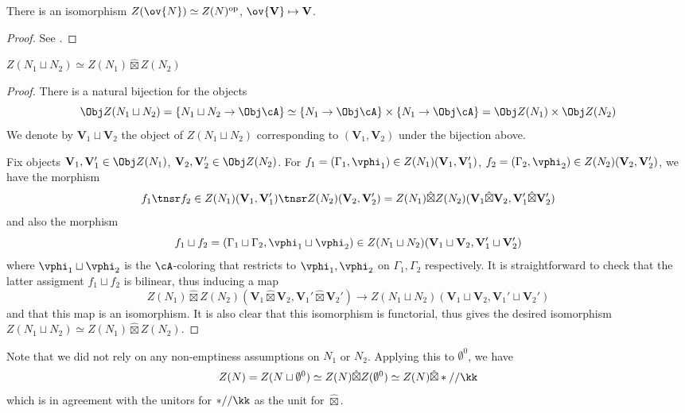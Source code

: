 \documentclass[12pt]{article}
\newcommand{\empt}[1]{{\emptyset^{#1}}}
\newcommand{\VV}{{\mathbf{V}}}
\newcommand{\op}{{\text{op}}}
\newcommand{\hatbox}{{\hat{\boxtimes}}}
\begin{document}
\begin{proposition}
\label{p:op-orient}
There is an isomorphism
$Z(\ov{N}) \simeq Z(N)^\op$,
$\ov{\VV} \mapsto \VV$.
\end{proposition}
\begin{proof}
See .
\end{proof}



\begin{proposition}
\label{p:disjoint-union-skein-cat}
$Z(N_1 \sqcup N_2) \simeq Z(N_1) \hatbox Z(N_2)$
\end{proposition}

\begin{proof}
There is a natural bijection for the objects
\[
\Obj Z(N_1 \sqcup N_2) = \{N_1 \sqcup N_2 \to \Obj \cA\}
\simeq \{N_1 \to \Obj \cA\} \times \{N_1 \to \Obj \cA\}
= \Obj Z(N_1) \times \Obj Z(N_2)
\]
We denote by $\VV_1 \sqcup \VV_2$ the object of $Z(N_1 \sqcup N_2)$
corresponding to $(\VV_1,\VV_2)$ under the bijection above.

Fix objects $\VV_1,\VV_1' \in \Obj Z(N_1)$,
$\VV_2,\VV_2' \in \Obj Z(N_2)$.
For $f_1 = (\Gamma_1,\vphi_1) \in Z(N_1)(\VV_1,\VV_1')$,
$f_2 = (\Gamma_2,\vphi_2) \in Z(N_2)(\VV_2,\VV_2')$,
we have the morphism
\[
f_1 \tnsr f_2 \in
Z(N_1)(\VV_1,\VV_1') \tnsr Z(N_2)(\VV_2,\VV_2')
= Z(N_1) \hatbox Z(N_2)(\VV_1 \hatbox \VV_2, \VV_1' \hatbox \VV_2')
\]
and also the morphism
\[
f_1 \sqcup f_2 = (\Gamma_1 \sqcup \Gamma_2, \vphi_1 \sqcup \vphi_2)
\in Z(N_1 \sqcup N_2) (\VV_1 \sqcup \VV_2, \VV_1' \sqcup \VV_2')
\]
where $\vphi_1 \sqcup \vphi_2$ is the $\cA$-coloring that
restricts to $\vphi_1,\vphi_2$ on $\Gamma_1,\Gamma_2$ respectively.
It is straightforward to check that
the latter assigment $f_1 \sqcup f_2$ is bilinear,
thus inducing a map
\[
Z(N_1) \hatbox Z(N_2)(\VV_1 \hatbox \VV_2, \VV_1' \hatbox \VV_2')
\to Z(N_1 \sqcup N_2) (\VV_1 \sqcup \VV_2, \VV_1' \sqcup \VV_2')
\]
and that this map is an isomorphism.
It is also clear that this isomorphism is functorial,
thus gives the desired isomorphism
$Z(N_1 \sqcup N_2) \simeq Z(N_1) \hatbox Z(N_2)$.
\end{proof}

Note that we did not rely on any non-emptiness assumptions
on $N_1$ or $N_2$.
Applying this to $\empt{0}$,
we have
\[
Z(N) = Z(N \sqcup \empt{0}) \simeq Z(N) \hatbox Z(\empt{0})
\simeq Z(N) \hatbox *//\kk
\]
which is in agreement with the unitors for
$*//\kk$ as the unit for $\hatbox$.


\begin{remark}
\label{r:1-bord-direction}
\end{remark}
\end{document}
